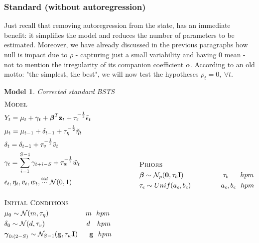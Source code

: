 \documentclass[11pt,twoside]{report}
\newtheorem{model}{Model}
\begin{document}
\subsubsection{Standard (without autoregression)}
Just recall that removing autoregression from the state, has an immediate benefit: it simplifies the model and reduces the number of parameters to be estimated. Moreover, we have already discussed in the previous paragraphs how null is impact due to $ \rho $ - capturing just a small variability and having 0 mean - not to mention the irregularity of its companion coefficient $ \alpha $. According to an old motto: "the simplest, the best", we will now test the hypotheses $ \rho_t=0,\ \forall t $.

\begin{model} Corrected standard BSTS
	\begin{equation*}
	\begin{aligned}
	&\textsc{Model}\\
	&Y_t = \mu_t + \gamma_t + \boldsymbol{\beta}^T\mathbf{z}_t + \tau_\epsilon^{-\frac{1}{2}}\tilde{\epsilon}_t\\
	&\mu_t = \mu_{t-1} + \delta_{t-1} +\tau_\eta^{-\frac{1}{2}}\tilde{\eta}_t\\
	&\delta_t = \delta_{t-1} + \tau_v^{-\frac{1}{2}}\tilde{v}_t\\
	&\gamma_t = \sum_{i=1}^{S-1}\gamma_{t+i-S} + \tau_w^{-\frac{1}{2}}\tilde{w}_t\\
	&\tilde{\epsilon}_t, \tilde{\eta}_t, \tilde{v}_t, \tilde{w}_t, \overset{iid}{\sim} \mathcal{N}(0,1)\\
	\\
	&\textsc{Initial Conditions}\\
	&\mu_0 \sim \mathcal{N}(m, \tau_\eta)\quad \quad \quad \quad \quad\  m\ \ hpm\\
	&\delta_0 \sim \mathcal{N}(d, \tau_v)\quad \quad \quad \quad \quad \quad d\ \ \ hpm\\
	&\boldsymbol{\gamma}_{0:(2-S)} \sim \mathcal{N}_{S-1}(\mathbf{g}, \tau_w\mathbf{I})\quad\ \ \mathbf{g}\ \ hpm\\
	\\
	\end{aligned}
	\qquad \qquad
	\begin{aligned}[c]
	&\textsc{Priors}\\
	&\boldsymbol{\beta} \sim \mathcal{N}_p(\mathbf{0}, \tau_b \mathbf{I})\ \ \quad \quad \quad \quad \quad \tau_b\ \quad \ hpm\\
	&\tau_\epsilon \sim Unif(a_\epsilon, b_\epsilon)\quad\quad\ \quad \quad a_\epsilon, b_\epsilon\ \ hpm\\

\end{aligned}
\end{equation*}
\end{model}
\end{document}
